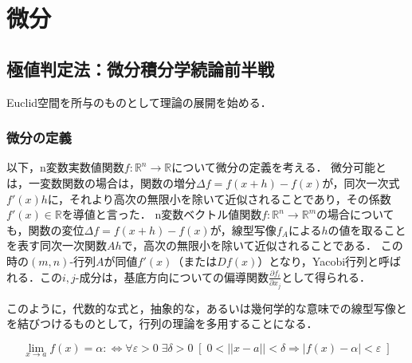 \documentclass[uplatex, dvipdfmx]{jsreport}
\begin{document}
\part{微分}
\chapter{極値判定法：微分積分学続論前半戦}
Euclid空間を所与のものとして理論の展開を始める．

\section{微分の定義}
以下，n変数実数値関数$f:\mathbb{R}^n\to\mathbb{R}$について微分の定義を考える．
微分可能とは，一変数関数の場合は，関数の増分$\Delta f=f(x+h)-f(x)$が，同次一次式$f'(x)h$に，それより高次の無限小を除いて近似されることであり，その係数$f'(x)\in\mathbb{R}$を導値と言った．
n変数ベクトル値関数$f:\mathbb{R}^n\to\mathbb{R}^m$の場合についても，関数の変位$\Delta f=f(x+h)-f(x)$が，線型写像$f_A$による$h$の値を取ることを表す同次一次関数$Ah$で，高次の無限小を除いて近似されることである．
この時の$(m,n)$-行列$A$が同値$f'(x)$（または$Df(x)$）となり，Yacobi行列と呼ばれる．この$i,j$-成分は，基底方向についての偏導関数$\frac{\partial f_i}{\partial x_j}$として得られる．

このように，代数的な式と，抽象的な，あるいは幾何学的な意味での線型写像とを結びつけるものとして，行列の理論を多用することになる．

\begin{definition}[収束]
    \[\lim_{x\to a}f(x)=\alpha :\Leftrightarrow \forall\varepsilon >0\;\exists\delta >0\; [\;0<||x-a||<\delta\Rightarrow |f(x)-\alpha |<\varepsilon\;]\]
\end{definition}
\end{document}
